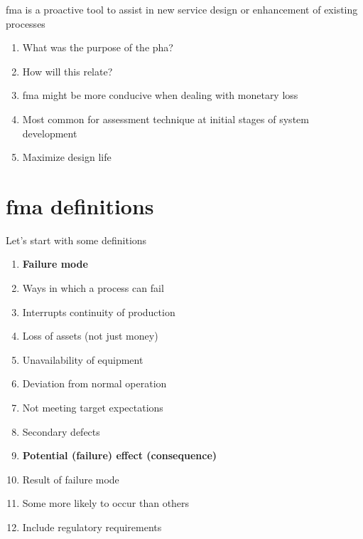 \documentclass[aspectratio=1610,pdftex,dvipsnames,compress,xcolor={dvipsnames}]{beamer}
\newcommand{\acs}{\acrshort} %
\begin{document}
\begin{frame}{\acs{fma} is a proactive tool to assist in new service design or enhancement of existing processes}
    \begin{enumerate}[series=outerlist,topsep=0pt,itemsep=21pt,leftmargin=*,label=(\arabic*)]
        \item[]What was the purpose of the \acs{pha}?
        \item[]How will this relate?
        \item[]\acs{fma} might be more conducive when dealing with monetary loss
        \item[]Most common for assessment technique at initial stages of system development
        \item[]Maximize design life
    \end{enumerate}
\end{frame}


\section{\acs{fma} definitions}


\addtocounter{framenumber}{-1}
\begin{frame}{Let's start with some definitions}
    \begin{enumerate}[series=outerlist,topsep=0pt,itemsep=1pt,leftmargin=*,label=(\arabic*)]
        \item[]\textbf{Failure mode}
        \item[]Ways in which a process can fail  
        \item[]Interrupts continuity of production  
        \item[]Loss of assets (not just money)  
        \item[]Unavailability of equipment  
        \item[]Deviation from normal operation
        \item[]Not meeting target expectations 
        \item[]Secondary defects 
            \vspace{0.10in}
        \item[]\textbf{Potential (failure) effect (consequence)}
        \item[]Result of failure mode
        \item[]Some more likely to occur than others
        \item[]Include regulatory requirements
    \end{enumerate}
\end{frame}
\end{document}
